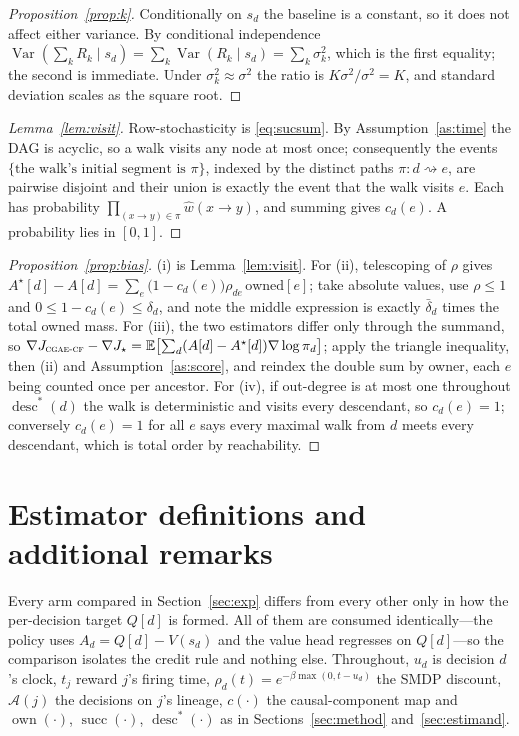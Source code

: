 \documentclass[review,authoryear,3p,times]{elsarticle}
\newcommand{\cflow}{\textsc{cgae-cf}}          %
\newcommand{\Ascr}{\mathcal{A}}
\newcommand{\Ex}{\mathbb{E}}
\newcommand{\Var}{\operatorname{Var}}
\newcommand{\desc}{\operatorname{desc}}
\newcommand{\suc}{\operatorname{succ}}
\newcommand{\own}{\operatorname{own}}
\begin{document}
\begin{proof}[Proposition~\ref{prop:k}]
Conditionally on $s_d$ the baseline is a constant, so it does not affect either
variance. By conditional independence
$\Var(\sum_k R_k\mid s_d)=\sum_k \Var(R_k\mid s_d)=\sum_k\sigma_k^2$, which is
the first equality; the second is immediate. Under
$\sigma_k^2\approx\sigma^2$ the ratio is $K\sigma^2/\sigma^2=K$, and standard
deviation scales as the square root.
\end{proof}

\begin{proof}[Lemma~\ref{lem:visit}]
Row-stochasticity is \eqref{eq:sucsum}. By Assumption~\ref{as:time} the DAG is
acyclic, so a walk visits any node at most once; consequently the events
$\{\text{the walk's initial segment is }\pi\}$, indexed by the distinct paths
$\pi: d\rightsquigarrow e$, are pairwise disjoint and their union is exactly the
event that the walk visits $e$. Each has probability
$\prod_{(x\to y)\in\pi}\hat w(x\!\to\!y)$, and summing gives $c_d(e)$. A
probability lies in $[0,1]$.
\end{proof}

\begin{proof}[Proposition~\ref{prop:bias}]
(i) is Lemma~\ref{lem:visit}. For (ii), telescoping of $\rho$ gives
$A^\star[d]-A[d]=\sum_{e}\bigl(1-c_d(e)\bigr)\rho_{de}\,\mathrm{owned}[e]$;
take absolute values, use $\rho\le1$ and $0\le 1-c_d(e)\le\delta_d$, and note
the middle expression is exactly $\bar\delta_d$ times the total owned mass.
For (iii), the two estimators differ only through the summand, so
$\nabla J_{\cflow}-\nabla J_{\star}
 =\Ex\bigl[\sum_d (A[d]-A^\star[d])\nabla\log\pi_d\bigr]$; apply the triangle
inequality, then (ii) and Assumption~\ref{as:score}, and reindex the double sum
by owner, each $e$ being counted once per ancestor. For (iv), if out-degree is
at most one throughout $\desc^{*}(d)$ the walk is deterministic and visits every
descendant, so $c_d(e)=1$; conversely $c_d(e)=1$ for all $e$ says every maximal
walk from $d$ meets every descendant, which is total order by reachability.
\end{proof}


\section{Estimator definitions and additional remarks}
\label{app:defs}

Every arm compared in Section~\ref{sec:exp} differs from every other only in
how the per-decision target $Q[d]$ is formed. All of them are consumed
identically---the policy uses $A_d=Q[d]-V(s_d)$ and the value head regresses on
$Q[d]$---so the comparison isolates the credit rule and nothing else. Throughout,
$u_d$ is decision $d$'s clock, $t_j$ reward $j$'s firing time,
$\rho_d(t)=e^{-\beta\max(0,t-u_d)}$ the SMDP discount, $\Ascr(j)$ the decisions
on $j$'s lineage, $c(\cdot)$ the causal-component map and $\own(\cdot)$,
$\suc(\cdot)$, $\desc^{*}(\cdot)$ as in Sections~\ref{sec:method}
and~\ref{sec:estimand}.
\end{document}
